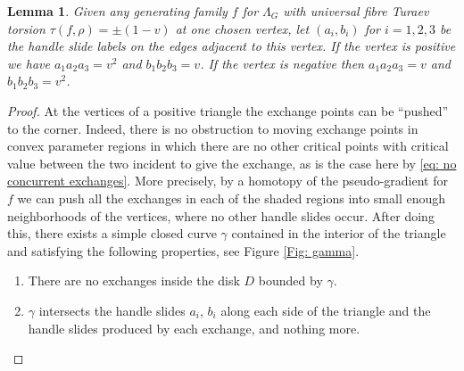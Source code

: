 \documentclass[JEP,XML,SOM,Unicode,NoFloatCountersInSection]{cedram}
\newenvironment{enumeratea}
{\bgroup\def\theenumi{\alph{enumi}}\begin{enumerate}}
{\end{enumerate}\egroup}
\theoremstyle{plain}
\newtheorem{lemma}[theorem]{Lemma}
\theoremstyle{definition}
\begin{document}
\begin{lemma}\label{a3=v2 and b3=v}
Given any generating family $f$ for $\Lambda_G$ with universal fibre Turaev torsion $\tau(f,\rho)=\pm(1-v)$ at one chosen vertex, let $(a_i,b_i)$ for $i=1,2,3$ be the handle slide labels on the edges adjacent to this vertex. If the vertex is positive we have $a_1a_2a_3=v^2$ and $b_1b_2b_3=v$. If the vertex is negative then $a_1a_2a_3=v$ and $b_1b_2b_3=v^2$.
\end{lemma}

\begin{proof}
At the vertices of a positive triangle the exchange points can be ``pushed'' to the corner. Indeed, there is no obstruction to moving exchange points in convex parameter regions in which there are no other critical points with critical value between the two incident to give the exchange, as is the case here by \eqref{eq: no concurrent exchanges}. More precisely, by a homotopy of the pseudo-gradient for $f$ we can push all the exchanges in each of the shaded regions into small enough neighborhoods of the vertices, where no other handle slides occur. After doing this, there exists a simple closed curve $\gamma$ contained in the interior of the triangle and satisfying the following properties, see Figure \ref{Fig: gamma}.
\begin{enumeratea}
\item\label{enum:a}
There are no exchanges inside the disk $D$ bounded by $\gamma$.
\item\label{enum:b}
$\gamma$ intersects the handle slides $a_i$, $b_i$ along each side of the triangle and the handle slides produced by each exchange, and nothing more.
\end{enumeratea}

\begin{figure}[htbp]
\begin{center}
\end{center}
\end{figure}
\end{proof}
\end{document}
